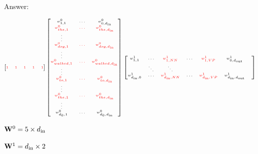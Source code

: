 \documentclass{beamer}
\begin{document}
\begin{frame}{Answer: }
  \begin{center}






  \[{\tiny
    \begin{bmatrix}
       \textcolor{red}{1}   & \textcolor{red}{1} &  \textcolor{red}{1} &
 \textcolor{red}{1}  & \textcolor{red}{1} \\
    \end{bmatrix}
    \begin{bmatrix}
      w^0_{1,1} &  \ldots &w^0_{0, {d_{\mathrm{in}}}}\\
      \textcolor{red}{w^0_{the,1}} &  \textcolor{red}{\ldots} &\textcolor{red}{w^0_{the,{d_{\mathrm{in}}}}}\\
      \vdots \\
      \textcolor{red}{w^0_{dog,1}} &  \textcolor{red}{\ldots} &\textcolor{red}{w^0_{dog,{d_{\mathrm{in}}}}}\\
      \vdots \\
      \textcolor{red}{w^0_{walked,1}} &  \textcolor{red}{\ldots} &\textcolor{red}{w^0_{walked,{d_{\mathrm{in}}}}}\\
      \vdots \\
      \textcolor{red}{w^0_{to,1}} &  \textcolor{red}{\ldots} &\textcolor{red}{w^0_{to,{d_{\mathrm{in}}}}}\\
      \vdots \\
      \textcolor{red}{w^0_{the,1}} &  \textcolor{red}{\ldots} &\textcolor{red}{w^0_{the,{d_{\mathrm{in}}}}}\\
      \vdots \\
      w^0_{d_0, 1} &  \ldots &w^0_{d_0, {d_{\mathrm{in}}}}\\
    \end{bmatrix}
    \begin{bmatrix}
      w^1_{1,1} &  \ldots&  \textcolor{red}{w^1_{1,NN}} & \ldots &  \textcolor{red}{w^1_{1,VP}} &    w^1_{0, {d_{\mathrm{out}}}}\\
                & \ddots & \ddots &                    &         &                                   &  \\
      w^1_{{d_{\mathrm{in}}},0} &  \ldots&  \textcolor{red}{w^1_{{d_{\mathrm{in}}},NN}} & \ldots &  \textcolor{red}{w^1_{{d_{\mathrm{in}}},VP}} &  w^1_{{d_{\mathrm{in}}}, {d_{\mathrm{out}}}}\\
    \end{bmatrix}
    }
  \]



\air

  $\mathbf{W}^0 = 5 \times {d_{\mathrm{in}}}$

  $\mathbf{W}^1 = {d_{\mathrm{in}}} \times 2$
  \end{center}

\end{frame}
\end{document}
